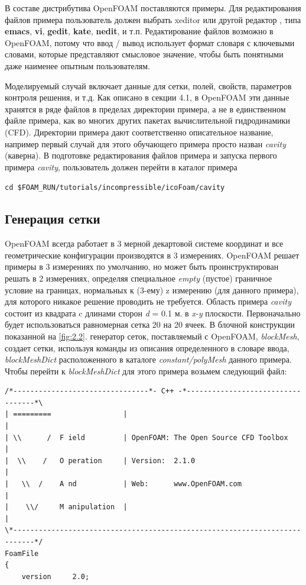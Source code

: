 В составе дистрибутива OpenFOAM поставляются примеры. Для редактирования файлов примера пользователь должен выбрать
 xeditor или другой редактор , типа \textbf{emacs}, \textbf{vi}, \textbf{gedit}, \textbf{kate}, \textbf{nedit},
 и т.п. Редактирование файлов возможно в OpenFOAM, потому что ввод / вывод использует формат словаря с ключевыми
 словами, которые представляют смысловое значение, чтобы быть понятными даже наименее опытным пользователям.

Моделируемый случай включает данные для сетки, полей, свойств, параметров контроля решения, и т.д.
 Как описано в секции 4.1, в OpenFOAM эти данные хранятся в ряде файлов в пределах директории примера,
 а не в единственном файле примера, как во многих других пакетах вычислительной гидродинамики (CFD).
 Директории примера дают соответственно описательное название, например первый случай для этого
 обучающего примера просто назван \textsl{cavity} (каверна). В подготовке редактирования файлов примера и
 запуска первого примера \textsl{cavity}, пользователь должен перейти в каталог примера

\texttt{cd \$FOAM\_RUN/tutorials/incompressible/icoFoam/cavity}

\subsection{Генерация сетки}
\label{sec:2.1.1.1}

OpenFOAM всегда работает в 3 мерной декартовой системе координат и все геометрические конфигурации производятся
 в 3 измерениях. OpenFOAM решает примеры в 3 измерениях по умолчанию, но может быть проинструктирован решать
 в 2 измерениях, определяя специальное \textsl{empty} (пустое) граничное условие на границах, нормальных к (3-ему)
 z измерению (для данного примера), для которого никакое решение проводить не требуется.
Область примера \textsl{cavity} состоит из квадрата c длинами сторон \textit{d} = 0.1 м. в \textit{x-y} плоскости.
Первоначально будет использоваться равномерная сетка 20 на 20 ячеек. В блочной конструкции показанной на \autoref{fig:2.2}. генератор сеток,
 поставляемый с OpenFOAM, \textit{blockMesh}, создает сетки, используя команды из описания определенного в словаре ввода,
 \textit{blockMeshDict} расположенного в каталоге \textit{constant/polyMesh} данного примера. Чтобы перейти к
 \textit{blockMeshDict}  для этого примера  возьмем следующий файл:
\begin{verbatim}
/*--------------------------------*- C++ -*----------------------------------*\
| =========                 |                                                 |
| \\      /  F ield         | OpenFOAM: The Open Source CFD Toolbox           |
|  \\    /   O peration     | Version:  2.1.0                                 |
|   \\  /    A nd           | Web:      www.OpenFOAM.com                      |
|    \\/     M anipulation  |                                                 |
\*---------------------------------------------------------------------------*/
FoamFile
{
    version     2.0;
\end{verbatim} 

